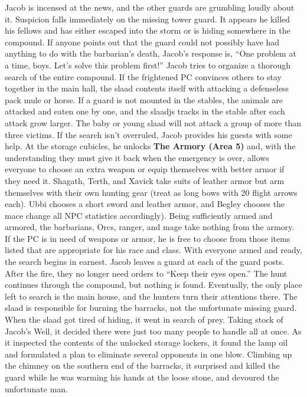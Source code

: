 \documentclass[a5paper,11pt,twoside]{book}
\newcommand{\MapText}[1]{
	{\color{DarkCyan} \textbf{#1}}
}
\begin{document}
{{{Jacob is incensed at the news, and the other guards are grumbling loudly about it.
Suspicion falls immediately on the missing tower guard.
It appears he killed his fellows and has either escaped into the storm or is hiding somewhere in the compound.
If anyone points out that the guard could not possibly have had anything to do with the barbarian’s death, Jacob’s response is, “One problem at a time, boys.
Let’s solve this problem first!” Jacob tries to organize a thorough search of the entire compound.
If the frightened PC convinces others to stay together in the main hall, the slaad contents itself with attacking a defenseless pack mule or horse.
If a guard is not mounted in the stables, the animals are attacked and eaten one by one, and the slaadjs tracks in the stable after each attack grow larger.
The baby or young slaad will not attack a group of more than three victims.
If the search isn’t overruled, Jacob provides his guests with some help.
At the storage cubicles, he unlocks \MapText{The Armory (Area 5)} and, with the understanding they must give it back when the emergency is over, allows everyone to choose an extra weapon or equip themselves with better armor if they need it.
Shagath, Terth, and Xavick take suits of leather armor but arm themselves with their own hunting gear (treat as long bows with 20 flight arrows each).
Ubbi chooses a short sword  and leather armor, and Begley chooses the mace {change all NPC statistics accordingly).
Being sufficiently armed and armored, the barbarians, Orcs, ranger, and mage take nothing from the armory.
If the PC is in need of weapons or armor, he is free to choose from those items listed that are appropriate for his race and class.
With everyone armed and ready, the search begins in earnest.
Jacob leaves a guard at each of the guard posts.
After the fire, they no longer need orders to “Keep their eyes open.” The hunt continues through the compound, but nothing is found.
Eventually, the only place left to search is the main house, and the hunters turn their attentions there.
The slaad is responsible for burning the barracks, not the unfortunate missing guard.
When the slaad got tired of hiding, it went in search of prey.
Taking stock of Jacob’s Well, it decided there were just too many people to handle all at once.
As it inspected the contents of the unlocked storage lockers, it found the lamp oil and formulated a plan to  eliminate several opponents in one blow.
Climbing up the chimney on the southern end of the barracks, it surprised and killed the guard while he was warming his hands at the loose stone, and devoured the unfortunate man.
}}}}
\end{document}
